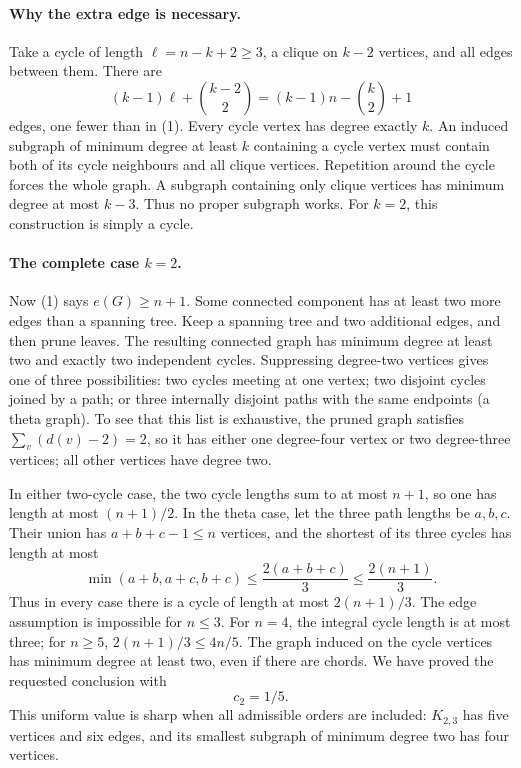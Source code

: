 \paragraph{Why the extra edge is necessary.}
Take a cycle of length \(\ell=n-k+2\geq3\), a clique on \(k-2\) vertices, and all edges between them. There are
\[
 (k-1)\ell+\binom{k-2}{2}
 =(k-1)n-\binom{k}{2}+1
\]
edges, one fewer than in (1). Every cycle vertex has degree exactly \(k\). An induced subgraph of minimum degree at least \(k\) containing a cycle vertex must contain both of its cycle neighbours and all clique vertices. Repetition around the cycle forces the whole graph. A subgraph containing only clique vertices has minimum degree at most \(k-3\). Thus no proper subgraph works. For \(k=2\), this construction is simply a cycle.

\paragraph{The complete case \(k=2\).}
Now (1) says \(e(G)\geq n+1\). Some connected component has at least two more edges than a spanning tree. Keep a spanning tree and two additional edges, and then prune leaves. The resulting connected graph has minimum degree at least two and exactly two independent cycles. Suppressing degree-two vertices gives one of three possibilities: two cycles meeting at one vertex; two disjoint cycles joined by a path; or three internally disjoint paths with the same endpoints (a theta graph). To see that this list is exhaustive, the pruned graph satisfies
\(\sum_v(d(v)-2)=2\), so it has either one degree-four vertex or two degree-three vertices; all other vertices have degree two.

In either two-cycle case, the two cycle lengths sum to at most \(n+1\), so one has length at most \((n+1)/2\). In the theta case, let the three path lengths be \(a,b,c\). Their union has \(a+b+c-1\leq n\) vertices, and the shortest of its three cycles has length at most
\[
 \min(a+b,a+c,b+c)\leq\frac{2(a+b+c)}3
 \leq\frac{2(n+1)}3.
\]
Thus in every case there is a cycle of length at most \(2(n+1)/3\). The edge assumption is impossible for \(n\leq3\). For \(n=4\), the integral cycle length is at most three; for \(n\geq5\), \(2(n+1)/3\leq4n/5\). The graph induced on the cycle vertices has minimum degree at least two, even if there are chords. We have proved the requested conclusion with
\[
 c_2=1/5.
\]
This uniform value is sharp when all admissible orders are included: \(K_{2,3}\) has five vertices and six edges, and its smallest subgraph of minimum degree two has four vertices.

